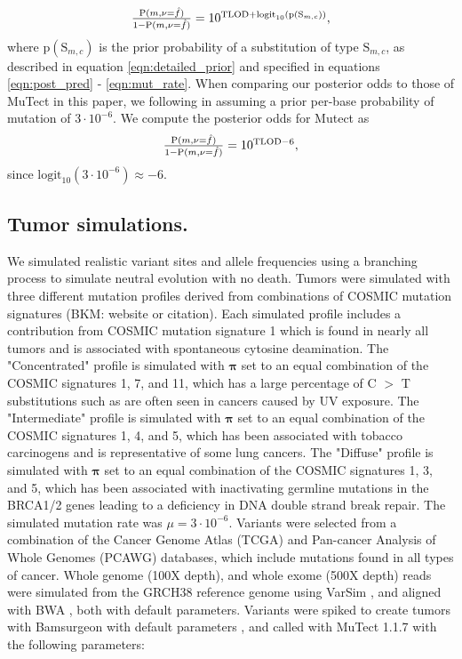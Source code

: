 \documentclass[a4,center,fleqn]{NAR}
\newcommand{\bkmcomment}[1]{{\color{blue}BKM: #1}}
\begin{document}
\begin{equation}
  \label{eqn:computed_posterior}
  $$
  \frac{\mathrm{P}(m,\nu = \hat{f})}{1 - \mathrm{P}(m,\nu = \hat{f})} = 10^{\mathrm{TLOD} + \mathrm{logit}_{10}(\mathrm{p}(\mathrm{S}_{m,c}))},
  $$
\end{equation}
where $\mathrm{p}(\mathrm{S}_{m,c})$ is the prior probability of a substitution of type $\mathrm{S}_{m,c}$, as described in equation \ref{eqn:detailed_prior} and specified in equations \ref{eqn:post_pred} - \ref{eqn:mut_rate}.
When comparing our posterior odds to those of MuTect in this paper, we following \citet{Cibulskis2013} in assuming a prior per-base probability of mutation of $3\cdot10^{-6}$.
We compute the posterior odds for Mutect as
\begin{equation}
  \label{eqn:mutect_posterior}
  $$
  \frac{\mathrm{P}(m,\nu = \hat{f})}{1 - \mathrm{P}(m,\nu = \hat{f})} = 10^{\mathrm{TLOD} - 6},
  $$
\end{equation}
since $\mathrm{logit}_{10}(3\cdot10^{-6}) \approx -6$.

\subsection{Tumor simulations.}
We simulated realistic variant sites and allele frequencies using a branching process to simulate neutral evolution with no death.
Tumors were simulated with three different mutation profiles derived from combinations of COSMIC mutation signatures (\bkmcomment{website or citation}).
Each simulated profile includes a contribution from COSMIC mutation signature 1 which is found in nearly all tumors and is associated with spontaneous cytosine deamination.
The "Concentrated" profile is simulated with $\mathbf{\pi}$ set to an equal combination of the COSMIC signatures 1, 7, and 11, which has a large percentage of C $>$ T substitutions such as are often seen in cancers caused by UV exposure.
The "Intermediate" profile is simulated with $\mathbf{\pi}$ set to an equal combination of the COSMIC signatures 1, 4, and 5, which has been associated with tobacco carcinogens and is representative of some lung cancers.
The "Diffuse" profile is simulated with $\mathbf{\pi}$ set to an equal combination of the COSMIC signatures 1, 3, and 5, which has been associated with inactivating germline mutations in the BRCA1/2 genes leading to a deficiency in DNA double strand break repair.
The simulated mutation rate was $\mu = 3\cdot10^{-6}$.
Variants were selected from a combination of the Cancer Genome Atlas (TCGA) and Pan-cancer Analysis of Whole Genomes (PCAWG) databases, which include mutations found in all types of cancer.
Whole genome (100X depth), and whole exome (500X depth) reads were simulated from the GRCH38 reference genome using VarSim \cite{Mu2015}, and aligned with BWA \cite{Li2009a}, both with default parameters.
Variants were spiked to create tumors with Bamsurgeon with default parameters \cite{Ewing2015a},
and called with MuTect 1.1.7 \cite{Cibulskis2013} with the following parameters:
\end{document}
